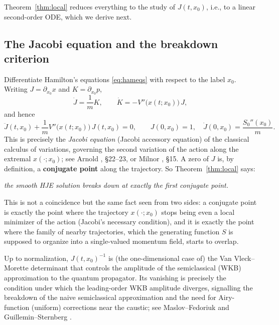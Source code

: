 Theorem~\ref{thm:local} reduces everything to the study of $J(t,x_0)$, i.e., to
a linear second-order ODE, which we derive next.

\subsection{The Jacobi equation and the breakdown criterion}
\label{sec:jacobi}

Differentiate Hamilton's equations \eqref{eq:hameqs} with respect to the label
$x_0$. Writing $J=\partial_{x_0}x$ and $K=\partial_{x_0}p$,
\[
\dot J = \frac{1}{m}K, \qquad \dot K = -V''\big(x(t;x_0)\big)\,J,
\]
and hence
\begin{equation}
\ddot J(t,x_0) + \frac{1}{m}V''\big(x(t;x_0)\big)\,J(t,x_0) = 0, \qquad J(0,x_0)=1, \quad \dot J(0,x_0) = \frac{S_0''(x_0)}{m}.
\label{eq:jacobi}
\end{equation}
This is precisely the \emph{Jacobi equation} (Jacobi accessory equation) of the
classical calculus of variations, governing the second variation of the action
along the extremal $x(\cdot;x_0)$; see Arnold \cite{Arnold}, \S22--23, or
Milnor \cite{Milnor}, \S15. A zero of $J$ is, by definition, a
\textbf{conjugate point} along the trajectory. So Theorem~\ref{thm:local} says:

\begin{center}
\emph{the smooth HJE solution breaks down at exactly the first conjugate point.}
\end{center}

This is not a coincidence but the same fact seen from two sides: a conjugate
point is exactly the point where the trajectory $x(\cdot;x_0)$ stops being even
a local minimizer of the action (Jacobi's necessary condition), and it is
exactly the point where the family of nearby trajectories, which the generating
function $S$ is supposed to organize into a single-valued momentum field,
starts to overlap.

\begin{remark}
Up to normalization, $J(t,x_0)^{-1}$ is (the one-dimensional case of) the Van
    Vleck--Morette determinant that controls the amplitude of the semiclassical
    (WKB) approximation to the quantum propagator. Its vanishing is precisely
    the condition under which the leading-order WKB amplitude diverges,
    signalling the breakdown of the naive semiclassical approximation and the
    need for Airy-function (uniform) corrections near the caustic; see
    Maslov--Fedoriuk \cite{MaslovFedoriuk} and Guillemin--Sternberg
    \cite{GuilleminSternberg}.
\end{remark}

